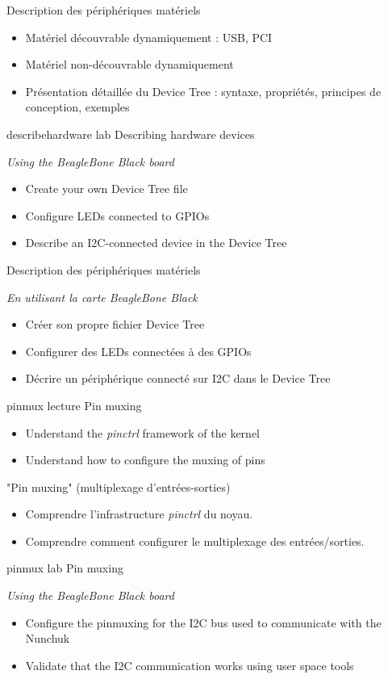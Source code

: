 {Description des périphériques matériels}
{
  \begin{itemize}
  \item Matériel découvrable dynamiquement : USB, PCI
  \item Matériel non-découvrable dynamiquement
  \item Présentation détaillée du Device Tree : syntaxe, propriétés,
    principes de conception, exemples
  \end{itemize}
}
{describehardware}
{lab}
{Describing hardware devices}
{
  {\em Using the BeagleBone Black board}
  \begin{itemize}
  \item Create your own Device Tree file
  \item Configure LEDs connected to GPIOs
  \item Describe an I2C-connected device in the Device Tree
  \end{itemize}
}
{Description des périphériques matériels}
{
  {\em En utilisant la carte BeagleBone Black}
  \begin{itemize}
  \item Créer son propre fichier Device Tree
  \item Configurer des LEDs connectées à des GPIOs
  \item Décrire un périphérique connecté sur I2C dans le Device Tree
  \end{itemize}
}
{pinmux}
{lecture}
{Pin muxing}
{
  \begin{itemize}
  \item Understand the {\em pinctrl} framework of the kernel
  \item Understand how to configure the muxing of pins
  \end{itemize}
}
{"Pin muxing" (multiplexage d'entrées-sorties)}
{
  \begin{itemize}
  \item Comprendre l'infrastructure {\em pinctrl} du noyau.
  \item Comprendre comment configurer le multiplexage des
    entrées/sorties.
  \end{itemize}
}
{pinmux}
{lab}
{Pin muxing}
{
  {\em Using the BeagleBone Black board}
  \begin{itemize}
  \item Configure the pinmuxing for the I2C bus used to communicate
    with the Nunchuk
  \item Validate that the I2C communication works using user space
    tools
  \end{itemize}
}
